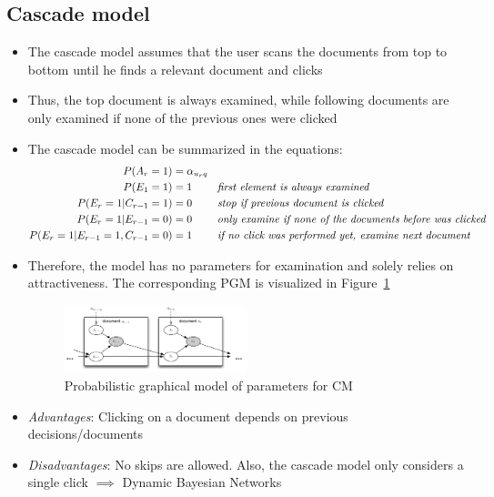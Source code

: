 \subsection{Cascade model}
\begin{itemize}
	\item The cascade model assumes that the user scans the documents from top to bottom until he finds a relevant document and clicks
	\item Thus, the top document is always examined, while following documents are only examined if none of the previous ones were clicked
	\item The cascade model can be summarized in the equations:
	\begin{equation*}
		\begin{split}
			P(A_r = 1) & = \alpha_{u_r q}\\
			P(E_1 = 1) & = 1 \textit{\hspace{7mm} first element is always examined}\\
			P(E_r = 1|C_{r-1} = 1) & = 0 \textit{\hspace{7mm} stop if previous document is clicked}\\
			P(E_r = 1|E_{r-1} = 0) & = 0 \textit{\hspace{7mm} only examine if none of the documents before was clicked}\\
			P(E_r = 1|E_{r-1}=1, C_{r-1}=0) & = 1 \textit{\hspace{7mm} if no click was performed yet, examine next document}\\
		\end{split}
	\end{equation*}
	\item Therefore, the model has no parameters for examination and solely relies on attractiveness. The corresponding PGM is visualized in Figure~\ref{img:click_models_CM_pgm}
	\begin{figure}[ht]
		\centering
		\includegraphics[width=0.5\textwidth]{figures/click_models_CM_pgm.png}
		\caption{Probabilistic graphical model of parameters for CM}
		\label{img:click_models_CM_pgm}
	\end{figure}
	\item \textit{Advantages}: Clicking on a document depends on previous decisions/documents
	\item \textit{Disadvantages}: No skips are allowed. Also, the cascade model only considers a single click $\implies$ Dynamic Bayesian Networks
\end{itemize}